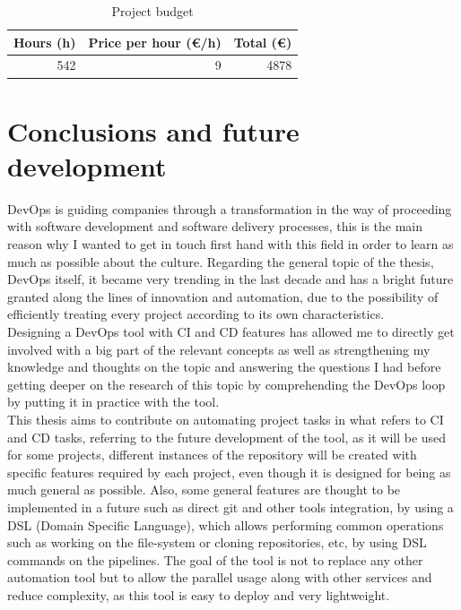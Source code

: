 \documentclass{article}
\begin{document}
\begin{table}[H]
\centering
\begin{tabular}{|r|r|r|}
\hline
\textbf{Hours (h)} & \textbf{Price per hour (€/h)} & \textbf{Total (€)} \\ \hline
542                 & 9    & 4878 \\ \hline
\end{tabular}
\caption{Project budget}
\end{table}


\newpage
\section{Conclusions and future development}

DevOps is guiding companies through a transformation in the way of proceeding with software development and software delivery processes, this is the main reason why I wanted to get in touch first hand with this field in order to learn as much as possible about the culture. Regarding the general topic of the thesis, DevOps itself, it became very trending in the last decade and has a bright future granted along the lines of innovation and automation, due to the possibility of efficiently treating every project according to its own characteristics.
~\\

Designing a DevOps tool with CI and CD features has allowed me to directly get involved with a big part of the relevant concepts as well as strengthening my knowledge and thoughts on the topic and answering the questions I had before getting deeper on the research of this topic by comprehending the DevOps loop by putting it in practice with the tool.
~\\

This thesis aims to contribute on automating project tasks in what refers to CI and CD tasks, referring to the future development of the tool, as it will be used for some projects, different instances of the repository will be created with specific features required by each project, even though it is designed for being as much general as possible. Also, some general features are thought to be implemented in a future such as direct git and other tools integration, by using a \gls{DSL} (Domain Specific Language), which allows performing common operations such as working on the file-system or cloning repositories, etc, by using DSL commands on the pipelines. The goal of the tool is not to replace any other automation tool but to allow the parallel usage along with other services and reduce complexity, as this tool is easy to deploy and very lightweight.
~\\
\end{document}
